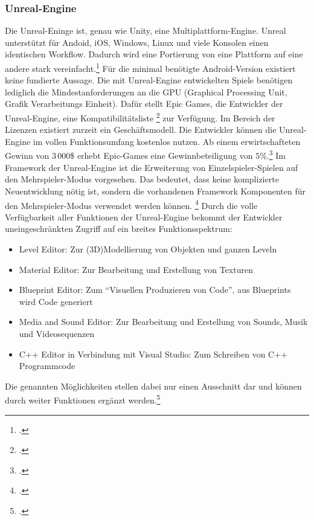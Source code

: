 	\subsubsection*{Unreal-Engine}
	Die Unreal-Eninge ist, genau wie Unity, eine Multiplattform-Engine. Unreal unterstützt für Andoid, iOS, Windows, Linux und viele Konsolen einen identischen Workflow. Dadurch wird eine Portierung von eine Plattform auf eine andere stark vereinfacht.\footcite[\url{https://www.unrealengine.com/what-is-unreal-engine-4}]{unreal-home} Für die minimal benötigte Android-Version existiert keine fundierte Aussage. Die mit Unreal-Engine entwickelten Spiele benötigen lediglich die Mindestanforderungen an die GPU (Graphical Processing Unit, Grafik Verarbeitungs Einheit). Dafür stellt Epic Games, die Entwickler der Unreal-Engine, eine Kompatibilitätsliste \footcite[\url{https://docs.unrealengine.com/latest/INT/Platforms/Android/DeviceCompatibility/index.html}]{unreal-home} zur Verfügung. Im Bereich der Lizenzen existiert zurzeit ein Geschäftsmodell. Die Entwickler können die Unreal-Engine im vollen Funktionsumfang kostenlos nutzen. Ab einem erwirtschafteten Gewinn von $3\, 000$\$ erhebt Epic-Games eine Gewinnbeteiligung von $5$\%.\footcite[\url{https://www.unrealengine.com/custom-licensing}]{unreal-home} Im Framework der Unreal-Engine ist die Erweiterung von Einzelspieler-Spielen auf den Mehrspieler-Modus vorgesehen. Das bedeutet, dass keine komplizierte Neuentwicklung nötig ist, sondern die vorhandenen Framework Komponenten für den Mehrspieler-Modus verwendet werden können. \footcite[\url{https://docs.unrealengine.com/latest/INT/Gameplay/Networking/Overview/index.html}]{unreal-home} Durch die volle Verfügbarkeit aller Funktionen der Unreal-Engine bekommt der Entwickler uneingeschränkten Zugriff auf ein breites Funktionsspektrum:
	\begin{itemize}
		\item{Level Editor: Zur (3D)Modellierung von Objekten und ganzen Leveln}
		\item{Material Editor: Zur Bearbeitung und Erstellung von Texturen}
		\item{Blueprint Editor: Zum \enquote{Visuellen Produzieren von Code}, aus Blueprints wird Code generiert}
		\item{Media and Sound Editor: Zur Bearbeitung und Erstellung von Sounds, Musik und Videosequenzen}
		\item{C++ Editor in Verbindung mit Visual Studio: Zum Schreiben von C++ Programmcode}
	\end{itemize}
	Die genannten Möglichkeiten stellen dabei nur einen Ausschnitt dar und können durch weiter Funktionen ergänzt werden.\footcite[https://docs.unrealengine.com/latest/INT/GettingStarted/SubEditors/]{unreal-home}

